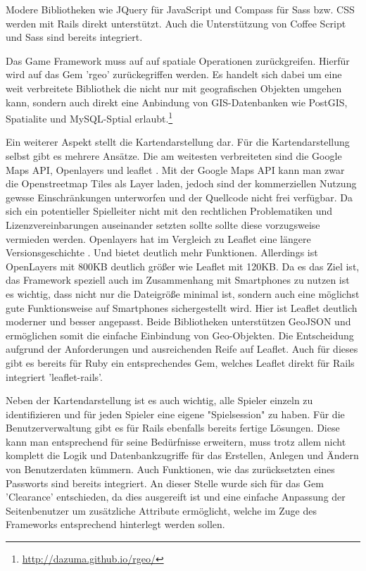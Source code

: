 Modere Bibliotheken wie JQuery für JavaScript und Compass für Sass bzw. CSS werden mit Rails direkt unterstützt. Auch die Unterstützung von Coffee Script und Sass sind bereits integriert.

Das Game Framework muss auf auf spatiale Operationen zurückgreifen. Hierfür wird auf das Gem 'rgeo' zurückegriffen werden. Es handelt sich dabei um eine weit verbreitete Bibliothek die nicht nur mit geografischen Objekten umgehen kann, sondern auch direkt eine Anbindung von GIS-Datenbanken wie PostGIS, Spatialite und MySQL-Sptial erlaubt.\footnote{\url{http://dazuma.github.io/rgeo/}}

Ein weiterer Aspekt stellt die Kartendarstellung dar. Für die Kartendarstellung selbst gibt es mehrere Ansätze. Die am weitesten verbreiteten sind die Google Maps API, Openlayers und leaflet \cite{Derrough.2013}. Mit der Google Maps API kann man zwar die Openstreetmap Tiles als Layer laden, jedoch sind der kommerziellen Nutzung gewsse Einschränkungen unterworfen und der Quellcode nicht frei verfügbar. Da sich ein potentieller Spielleiter nicht mit den rechtlichen Problematiken und Lizenzvereinbarungen auseinander setzten sollte sollte diese vorzugsweise vermieden werden. Openlayers hat im Vergleich zu Leaflet eine längere Versionsgeschichte \cite{Ohloh.2014}. Und bietet deutlich mehr Funktionen. Allerdings ist OpenLayers mit 800KB deutlich größer wie Leaflet mit 120KB. Da es das Ziel ist, das Framework speziell auch im Zusammenhang mit Smartphones zu nutzen ist es wichtig, dass nicht nur die Dateigröße minimal ist, sondern auch eine möglichst gute Funktionsweise auf Smartphones sichergestellt wird. Hier ist Leaflet deutlich moderner und besser angepasst. Beide Bibliotheken unterstützen GeoJSON und ermöglichen somit die einfache Einbindung von Geo-Objekten. Die Entscheidung aufgrund der Anforderungen und ausreichenden Reife auf Leaflet. Auch für dieses gibt es bereits für Ruby ein entsprechendes Gem, welches Leaflet direkt für Rails integriert 'leaflet-rails'.

Neben der Kartendarstellung ist es auch wichtig, alle Spieler einzeln zu identifizieren und für jeden Spieler eine eigene "Spielsession" zu haben. Für die Benutzerverwaltung gibt es für Rails ebenfalls bereits fertige Lösungen. Diese kann man entsprechend für seine Bedürfnisse erweitern, muss trotz allem nicht komplett die Logik und Datenbankzugriffe für das Erstellen, Anlegen und Ändern von Benutzerdaten kümmern. Auch Funktionen, wie das zurücksetzten eines Passworts sind bereits integriert. An dieser Stelle wurde sich für das Gem 'Clearance' entschieden, da dies ausgereift ist und eine einfache Anpassung der Seitenbenutzer um zusätzliche Attribute ermöglicht, welche im Zuge des Frameworks entsprechend hinterlegt werden sollen.

